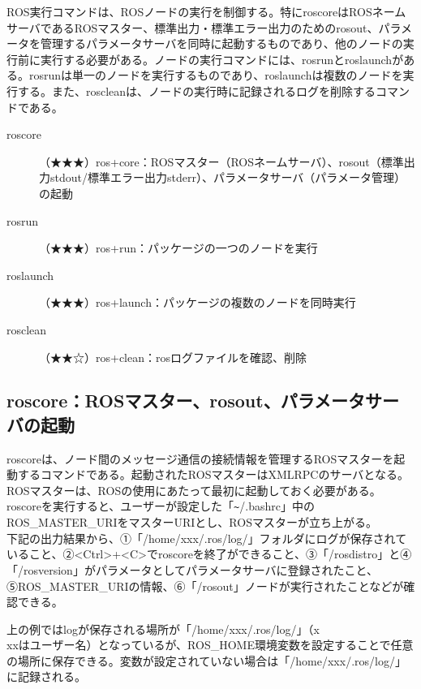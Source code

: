 ROS実行コマンドは、ROSノードの実行を制御する。特にroscoreはROSネームサーバであるROSマスター、標準出力・標準エラー出力のためのrosout、パラメータを管理するパラメータサーバを同時に起動するものであり、他のノードの実行前に実行する必要がある。ノードの実行コマンドには、rosrunとroslaunchがある。rosrunは単一のノードを実行するものであり、roslaunchは複数のノードを実行する。また、roscleanは、ノードの実行時に記録されるログを削除するコマンドである。

\vspace{\baselineskip}
\noindent
\begin{description}
\item[roscore]（★★★）ros+core：ROSマスター（ROSネームサーバ）、rosout（標準出力stdout/標準エラー出力stderr）、パラメータサーバ（パラメータ管理）の起動
\item[rosrun]（★★★）ros+run：パッケージの一つのノードを実行
\item[roslaunch]（★★★）ros+launch：パッケージの複数のノードを同時実行
\item[rosclean]（★★☆）ros+clean：rosログファイルを確認、削除
\end{description}

\subsection{roscore：ROSマスター、rosout、パラメータサーバの起動}

roscoreは、ノード間のメッセージ通信の接続情報を管理するROSマスターを起動するコマンドである。起動されたROSマスターはXMLRPCのサーバとなる。ROSマスターは、ROSの使用にあたって最初に起動しておく必要がある。roscoreを実行すると、ユーザーが設定した「\verb|~|/.bashrc」中のROS\_MASTER\_URIをマスターURIとし、ROSマスターが立ち上がる。\\

下記の出力結果から、①「/home/xxx/.ros/log/」フォルダにログが保存されていること、②<Ctrl>+<C>でroscoreを終了ができること、③「/rosdistro」と④「/rosversion」がパラメータとしてパラメータサーバに登録されたこと、⑤ROS\_MASTER\_URIの情報、⑥「/rosout」ノードが実行されたことなどが確認できる。\\

\begin{exercise}[ログの保存場所]
上の例ではlogが保存される場所が「/home/xxx/.ros/log/」（x\\xxはユーザー名）となっているが、ROS\_HOME環境変数を設定することで任意の場所に保存できる。変数が設定されていない場合は「/home/xxx/.ros/log/」に記録される。
\end{exercise}

